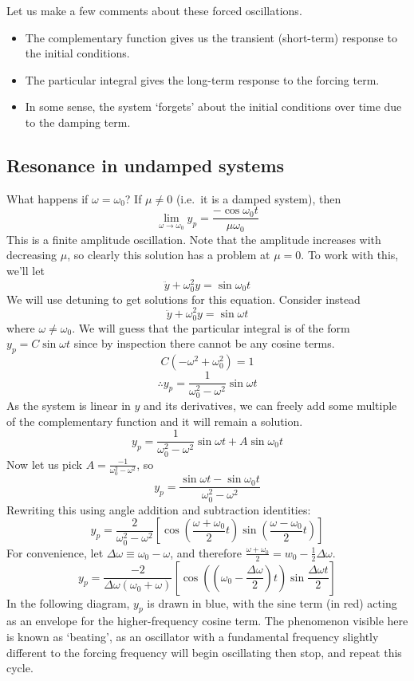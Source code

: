 \noindent Let us make a few comments about these forced oscillations.
\begin{itemize}
	\item The complementary function gives us the transient (short-term) response to the initial conditions.
	\item The particular integral gives the long-term response to the forcing term.
	\item In some sense, the system `forgets' about the initial conditions over time due to the damping term.
\end{itemize}

\subsection{Resonance in undamped systems}
What happens if \(\omega = \omega_0\)?
If \(\mu \neq 0\) (i.e.\ it is a damped system), then
\[
	\lim_{\omega \to \omega_0} y_p = \frac{-\cos\omega_0 t}{\mu\omega_0}
\]
This is a finite amplitude oscillation.
Note that the amplitude increases with decreasing \(\mu\), so clearly this solution has a problem at \(\mu = 0\).
To work with this, we'll let
\[
	\ddot y + \omega_0^2 y = \sin\omega_0 t
\]
We will use detuning to get solutions for this equation.
Consider instead
\[
	\ddot y + \omega_0^2 y = \sin\omega t
\]
where \(\omega \neq \omega_0\).
We will guess that the particular integral is of the form \(y_p = C\sin\omega t\) since by inspection there cannot be any cosine terms.
\[
	C(-\omega^2 + \omega_0^2) = 1
\]
\[
	\therefore y_p = \frac{1}{\omega_0^2 - \omega^2}\sin\omega t
\]
As the system is linear in \(y\) and its derivatives, we can freely add some multiple of the complementary function and it will remain a solution.
\[
	y_p = \frac{1}{\omega_0^2 - \omega^2}\sin\omega t + A \sin\omega_0 t
\]
Now let us pick \(A = \frac{-1}{\omega_0^2 - \omega^2}\), so
\[
	y_p = \frac{\sin \omega t - \sin \omega_0 t}{\omega_0^2 - \omega^2}
\]
Rewriting this using angle addition and subtraction identities:
\[
	y_p = \frac{2}{\omega_0^2 - \omega^2}\left[ \cos\left( \frac{\omega + \omega_0}{2}t \right) \sin\left( \frac{\omega - \omega_0}{2}t \right) \right]
\]
For convenience, let \(\Delta\omega \equiv \omega_0 - \omega\), and therefore \(\frac{\omega + \omega_0}{2} = w_0 - \frac{1}{2}\Delta\omega\).
\[
	y_p = \frac{-2}{\Delta\omega(\omega_0 + \omega)}\left[ \cos\left( \left(\omega_0 - \frac{\Delta\omega}{2}\right)t \right) \sin\frac{\Delta\omega t}{2} \right]
\]
In the following diagram, \(y_p\) is drawn in blue, with the sine term (in red) acting as an envelope for the higher-frequency cosine term.
The phenomenon visible here is known as `beating', as an oscillator with a fundamental frequency slightly different to the forcing frequency will begin oscillating then stop, and repeat this cycle.\medskip

